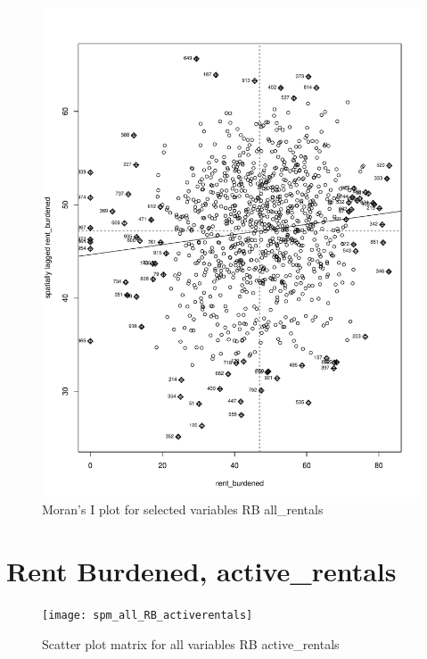 \documentclass[10pt, letterpaper]{amsart}
\begin{document}
\begin{figure}[H]
  \caption{Moran's I plot for selected variables RB all\_rentals}
  \includegraphics[scale=0.6]{Moran_RB_allrentals}
\end{figure}


\newpage
\section{Rent Burdened, active\_rentals}

\begin{figure}[H]
  \caption{Scatter plot matrix for all variables RB active\_rentals}
  \texttt{[image: spm\_all\_RB\_activerentals]}
\end{figure}
\end{document}
